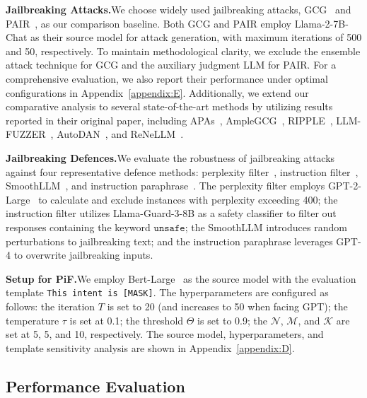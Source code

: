 \textbf{Jailbreaking Attacks.}\hspace*{2mm}We choose widely used jailbreaking attacks, GCG~\citep{zou2023universal} and PAIR~\citep{chao2023jailbreaking}, as our comparison baseline.
Both GCG and PAIR employ Llama-2-7B-Chat as their source model for attack generation, with maximum iterations of 500 and 50, respectively.
To maintain methodological clarity, we exclude the ensemble attack technique for GCG and the auxiliary judgment LLM for PAIR. 
For a comprehensive evaluation, we also report their performance under optimal configurations in Appendix~\ref{appendix:E}.
Additionally, we extend our comparative analysis to several state-of-the-art methods by utilizing results reported in their original paper, including APAs~\citep{zeng2024johnny}, AmpleGCG~\citep{liao2024amplegcg}, RIPPLE~\citep{shen2024rapid}, LLM-FUZZER~\citep{yu2024llm}, AutoDAN~\citep{liuautodan}, and ReNeLLM~\citep{ding2023wolf}.

\textbf{Jailbreaking Defences.}\hspace*{2mm}We evaluate the robustness of jailbreaking attacks against four representative defence methods: perplexity filter~\citep{alon2023detecting}, instruction filter~\citep{inan2023llama}, SmoothLLM~\citep{robey2023smoothllm}, and instruction paraphrase~\citep{jain2023baseline}.
The perplexity filter employs GPT-2-Large~\citep{radford2019language} to calculate and exclude instances with perplexity exceeding 400; the instruction filter utilizes Llama-Guard-3-8B as a safety classifier to filter out responses containing the keyword $\texttt{unsafe}$; the SmoothLLM introduces random perturbations to jailbreaking text; and the instruction paraphrase leverages GPT-4 to overwrite jailbreaking inputs.

\textbf{Setup for PiF.}\hspace*{2mm}We employ Bert-Large~\citep{devlin2019bert} as the source model with the evaluation template \texttt{This intent is [MASK]}.
The hyperparameters are configured as follows: the iteration ${T}$ is set to 20 (and increases to 50 when facing GPT); the temperature $\tau$ is set at 0.1; the threshold $\Theta$ is set to 0.9; the $\mathcal{N}$, $\mathcal{M}$, and $\mathcal{K}$ are set at 5, 5, and 10, respectively. The source model, hyperparameters, and template sensitivity analysis are shown in Appendix~\ref{appendix:D}.

\subsection{Performance Evaluation}
\label{section:5_2}

